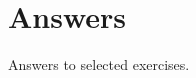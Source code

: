 \chapter{Answers}
Answers to selected exercises.\\
\begin{multicols}{2}%
	\setlength{\columnseprule}{0pt}
	\shipoutAnswer
\end{multicols}
